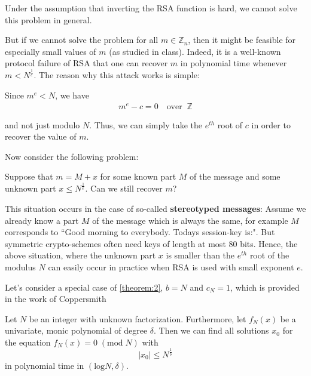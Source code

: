 \documentclass[10pt,twoside]{article}
\begin{document}
Under the assumption that inverting the RSA function is hard, we cannot solve this problem in general. \newline

But if we cannot solve the problem for all $m \in \mathbb{Z}_n$, then it might be feasible for especially small values of $m$ (as studied in class). Indeed, it is a well-known protocol failure of RSA that one can recover $m$ in polynomial time whenever $m < N^{\frac{1}{e}}$. The reason why this attack works is simple: \newline

Since $m^e < N$, we have
\begin{align}
  m^e - c = 0 \quad \text{over} \; \; \mathbb{Z} \label{eq:4}
\end{align}

and not just modulo $N$. Thus, we can simply take the $e^{th}$ root of $c$ in order to recover the value of $m$. \newline

Now consider the following problem:

\begin{problem} \label{prob:1}
  Suppose that $m = M + x$ for some known part $M$ of the message and some unknown part $x \leq N^{\frac{1}{e}}$. Can we still recover $m$?
\end{problem}

This situation occurs in the case of so-called \textbf{stereotyped messages}: Assume we already know a part $M$ of the message which is always the same, for example $M$ corresponds to ``Good morning to everybody. Todays session-key is:". But symmetric crypto-schemes often need keys of length at most $80$ bits. Hence, the above situation, where the unknown part $x$ is smaller than the $e^{th}$ root of the modulus $N$ can easily occur in practice when RSA is used with small exponent $e$. \newline

Let's consider a special case of \cref{theorem:2}, $b = N$ and $c_N = 1$, which is provided in the work of Coppersmith \cite{Coppersmith1997}

\begin{theorem} \label{theorem:3}
  Let $N$ be an integer with unknown factorization. Furthermore, let $f_N(x)$ be a univariate, monic polynomial of degree $\delta$. Then we can find all solutions $x_0$ for the equation $f_N(x) = 0 \; (\text{mod} \; N)$ with
  $$|x_0| \leq N^{\frac{1}{\delta}}$$
  in polynomial time in $(\text{log}N, \delta)$.
\end{theorem}
\end{document}
